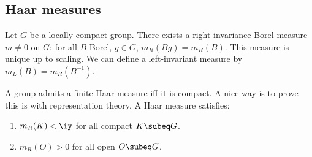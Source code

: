 
\subsection{Haar measures}

Let $G$ be a locally compact group. There exists a right-invariance Borel measure $m\ne 0$ on $G$: for all $B$ Borel, $g\in G$, $m_R(Bg)=m_R(B)$. This measure is unique up to scaling. We can define a left-invariant measure by $m_L(B) = m_R(B^{-1})$. 

A group admits a finite Haar measure iff it is compact. 
A nice way is to prove this is with representation theory. 
A Haar measure satisfies:
\begin{enumerate}
\item
$m_R(K)<\iy$ for all compact $K\subeq G$. 
\item
$m_R(O)>0$ for all open $O\subeq G$.
\end{enumerate}

